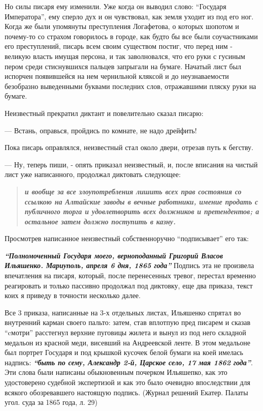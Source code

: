 \documentclass[a4paper,20pt]{article}
\begin{document}

Но силы писаря ему изменили. Уже когда он выводил слово: \enquote{Государя
Императора}, ему сперло дух и он чувствовал, как земля уходит из под его ног.
Когда же были упомянуты преступления Логафетова, о которых шопотом и почему-то
со страхом говорилось в городе, как будто бы все были соучастниками его
преступлений, писарь всем своим существом постиг, что перед ним - великую
власть имущая персона, и так заволновался, что его руки с гусиным пером среди
стиснувшихся пальцев запрыгали на бумаге. Начатый лист был испорчен появившейся
на нем чернильной кляксой и до неузнаваемости безобразно выведенными буквами
последних слов, отражавшими пляску руки на бумаге.

Неизвестный прекратил диктант и повелительно сказал писарю:

— Встань, оправься, пройдись по комнате, не надо дрейфить!

Пока писарь оправлялся, неизвестный стал около двери, отрезав путь к бегству. 

— Ну, теперь пиши, - опять приказал неизвестный, и, после вписания на чистый
лист уже написанного, продолжал диктовать следующее:
\begin{quote}
\em\bfseries
и вообще за все злоупотребления лишить всех прав состояния со ссылкою на Алтайские заводы 
в вечные работники, имение продать с публичного торга и удовлетворить всех должников и претендентов; а остальное затем
должно поступить в казну.
\end{quote}

Просмотрев написанное неизвестный собственноручно ``подписывает'' его так: 

\textbf{\em ``Полномоченный Государя моего, верноподанный Григорий Власов Ильяшенко. Мариуполь, апреля 6 дня, 1865 года''}
Подпись эта не произвела впечатления
на писаря, который, после перенесенных тревог, перестал временно реагировать и
только пассивно продолжал под диктовку, еще два приказа, текст коих я приведу в
точности несколько далее.

Все 3 приказа, написанные на 3-х отдельных листах, Ильяшенко спрятал во
внутренний карман своего пальто: затем, став вплотпую пред писарем и сказав
``cмотри'' расстегнул верхние пуговицы жилета и вынул из под него складной
медальон из красной меди, висевший на Андреевской ленте.  В этом медальоне был
портрет Государя и под крышкой кусочек белой бумаги на коей имелась надпись:
\textbf{\em ``быть по сему, Александр 2-й, Царское село, 17 мая 1862 года''}.
Эти слова были написаны обыкновенным почерком Ильяшепко, как это удостоверено
судебной экспертизой и как это было очевидно впоследствии для всякого
обозревавшего настоящую подпись. (Журнал решений Екатер. Палаты угол. суда за
1865 года, л. 29)
\end{document}
